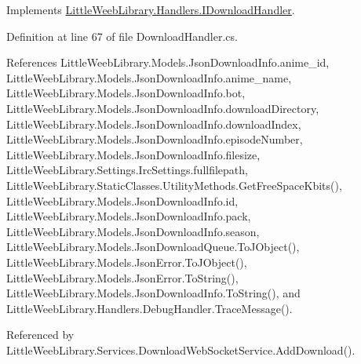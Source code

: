 Implements \mbox{\hyperlink{interface_little_weeb_library_1_1_handlers_1_1_i_download_handler_aa3c1ffac97fec47757494e14b5ade3d6}{Little\+Weeb\+Library.\+Handlers.\+I\+Download\+Handler}}.



Definition at line 67 of file Download\+Handler.\+cs.



References Little\+Weeb\+Library.\+Models.\+Json\+Download\+Info.\+anime\+\_\+id, Little\+Weeb\+Library.\+Models.\+Json\+Download\+Info.\+anime\+\_\+name, Little\+Weeb\+Library.\+Models.\+Json\+Download\+Info.\+bot, Little\+Weeb\+Library.\+Models.\+Json\+Download\+Info.\+download\+Directory, Little\+Weeb\+Library.\+Models.\+Json\+Download\+Info.\+download\+Index, Little\+Weeb\+Library.\+Models.\+Json\+Download\+Info.\+episode\+Number, Little\+Weeb\+Library.\+Models.\+Json\+Download\+Info.\+filesize, Little\+Weeb\+Library.\+Settings.\+Irc\+Settings.\+fullfilepath, Little\+Weeb\+Library.\+Static\+Classes.\+Utility\+Methods.\+Get\+Free\+Space\+Kbits(), Little\+Weeb\+Library.\+Models.\+Json\+Download\+Info.\+id, Little\+Weeb\+Library.\+Models.\+Json\+Download\+Info.\+pack, Little\+Weeb\+Library.\+Models.\+Json\+Download\+Info.\+season, Little\+Weeb\+Library.\+Models.\+Json\+Download\+Queue.\+To\+J\+Object(), Little\+Weeb\+Library.\+Models.\+Json\+Error.\+To\+J\+Object(), Little\+Weeb\+Library.\+Models.\+Json\+Error.\+To\+String(), Little\+Weeb\+Library.\+Models.\+Json\+Download\+Info.\+To\+String(), and Little\+Weeb\+Library.\+Handlers.\+Debug\+Handler.\+Trace\+Message().



Referenced by Little\+Weeb\+Library.\+Services.\+Download\+Web\+Socket\+Service.\+Add\+Download().


